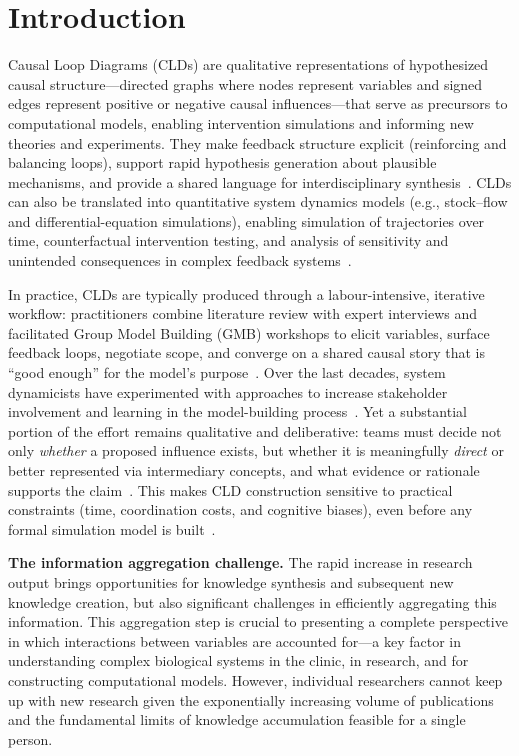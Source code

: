 \chapter{Introduction}
\label{ch:introduction}

Causal Loop Diagrams (CLDs) are qualitative representations of hypothesized causal structure---directed graphs where nodes represent variables and signed edges represent positive or negative causal influences---that serve as precursors to computational models, enabling intervention simulations and informing new theories and experiments. They make feedback structure explicit (reinforcing and balancing loops), support rapid hypothesis generation about plausible mechanisms, and provide a shared language for interdisciplinary synthesis~\citep{sterman2002system,vennix1996gmb}. CLDs can also be translated into quantitative system dynamics models (e.g., stock--flow and differential-equation simulations), enabling simulation of trajectories over time, counterfactual intervention testing, and analysis of sensitivity and unintended consequences in complex feedback systems~\citep{sterman2002system}.

In practice, CLDs are typically produced through a labour-intensive, iterative workflow: practitioners combine literature review with expert interviews and facilitated Group Model Building (GMB) workshops to elicit variables, surface feedback loops, negotiate scope, and converge on a shared causal story that is ``good enough'' for the model's purpose~\citep{sterman2002system,vennix1996gmb}. Over the last decades, system dynamicists have experimented with approaches to increase stakeholder involvement and learning in the model-building process~\citep{rouwette2002gmb_effectiveness}. Yet a substantial portion of the effort remains qualitative and deliberative: teams must decide not only \emph{whether} a proposed influence exists, but whether it is meaningfully \emph{direct} or better represented via intermediary concepts, and what evidence or rationale supports the claim~\citep{richardson1986problemscld,crielaard2024refining}. This makes CLD construction sensitive to practical constraints (time, coordination costs, and cognitive biases), even before any formal simulation model is built~\citep{rouwette2002gmb_effectiveness}.

\medskip
\noindent
\textbf{The information aggregation challenge.} The rapid increase in research output brings opportunities for knowledge synthesis and subsequent new knowledge creation, but also significant challenges in efficiently aggregating this information. This aggregation step is crucial to presenting a complete perspective in which interactions between variables are accounted for---a key factor in understanding complex biological systems in the clinic, in research, and for constructing computational models. However, individual researchers cannot keep up with new research given the exponentially increasing volume of publications and the fundamental limits of knowledge accumulation feasible for a single person.

